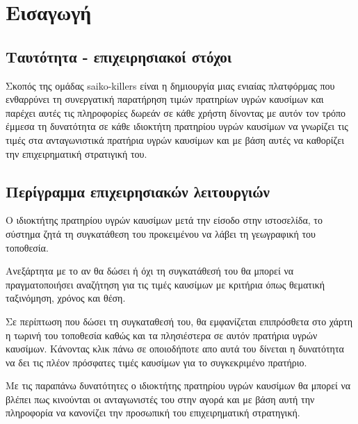 \section{Εισαγωγή}

\subsection{Ταυτότητα - επιχειρησιακοί στόχοι}

Σκοπός της ομάδας saiko-killers είναι η δημιουργία μιας ενιαίας πλατφόρμας που ενθαρρύνει τη συνεργατική παρατήρηση τιμών πρατηρίων υγρών καυσίμων και παρέχει αυτές τις πληροφορίες δωρεάν σε κάθε χρήστη δίνοντας με αυτόν τον τρόπο έμμεσα τη δυνατότητα σε κάθε ιδιοκτήτη πρατηρίου υγρών καυσίμων να γνωρίζει τις τιμές στα ανταγωνιστικά πρατήρια υγρών καυσίμων και με βάση αυτές να καθορίζει την επιχειρηματική στρατιγική του.

\subsection{Περίγραμμα επιχειρησιακών λειτουργιών}

O ιδιοκτήτης πρατηρίου υγρών καυσίμων μετά την είσοδο στην ιστοσελίδα, το σύστημα ζητά τη συγκατάθεση του προκειμένου να λάβει τη γεωγραφική του τοποθεσία. 

Ανεξάρτητα με το αν θα δώσει ή όχι τη συγκατάθεσή του θα μπορεί να πραγματοποιήσει αναζήτηση για τις τιμές καυσίμων με κριτήρια όπως θεματική ταξινόμηση, χρόνος και θέση.

Σε περίπτωση που δώσει τη συγκαταθεσή του, θα εμφανίζεται επιπρόσθετα στο χάρτη η τωρινή του τοποθεσία καθώς και τα πλησιέστερα σε αυτόν πρατήρια υγρών καυσίμων. Κάνοντας κλικ πάνω σε οποιοδήποτε απο αυτά του δίνεται η δυνατότητα να δει τις πλέον πρόσφατες τιμές καυσίμων για το συγκεκριμένο πρατήριο.

Με τις παραπάνω δυνατότητες ο ιδιοκτήτης πρατηρίου υγρών καυσίμων θα μπορεί να βλέπει πως κινούνται οι ανταγωνιστές του στην αγορά και με βάση αυτή την πληροφορία να κανονίζει την προσωπική του επιχειρηματική στρατηγική.


